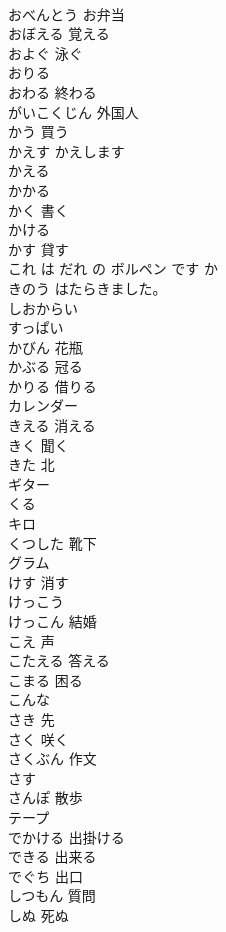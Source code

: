 \documentclass[8pt]{extreport}
\begin{document}
\begin{CJK}{UTF8}{min}
\\	おべんとう	お弁当
\\	おぼえる	覚える
\\	およぐ	泳ぐ
\\	おりる	
\\	おわる	終わる
\\	がいこくじん	外国人
\\	かう	買う
\\	かえす	かえします
\\	かえる	
\\	かかる	
\\	かく	書く
\\	かける	
\\	かす	貸す
\\	これ は だれ の ボルペン です か	
\\	[わたしは] きのう はたらきました。	
\\	しおからい	
\\	すっぱい	
\\	かびん	花瓶
\\	かぶる	冠る
\\	かりる	借りる
\\	カレンダー	
\\	きえる	消える
\\	きく	聞く
\\	きた	北
\\	ギター	
\\	くる	
\\	キロ	
\\	くつした	靴下
\\	グラム	
\\	けす	消す
\\	けっこう	
\\	けっこん	結婚
\\	こえ	声
\\	こたえる	答える
\\	こまる	困る
\\	こんな	
\\	さき	先
\\	さく	咲く
\\	さくぶん	作文
\\	さす	
\\	さんぽ	散歩
\\	テープ	
\\	でかける	出掛ける
\\	できる	出来る
\\	でぐち	出口
\\	しつもん	質問
\\	しぬ	死ぬ

\end{CJK}
\end{document}

